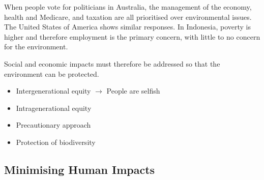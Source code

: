 		When people vote for politicians in Australia, the management of the economy, health and Medicare, and taxation are all prioritised over environmental issues. The United States of America shows similar responses. In Indonesia, poverty is higher and therefore employment is the primary concern, with little to no concern for the environment.

		Social and economic impacts must therefore be addressed so that the environment can be protected.

		\begin{itemize}
			\item Intergenerational equity $\rightarrow$ People are selfish
			\item Intragenerational equity
			\item Precautionary approach
			\item Protection of biodiversity
		\end{itemize}

	\subsection{Minimising Human Impacts}
	
